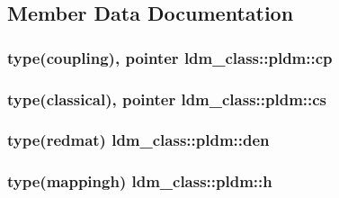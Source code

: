 \subsection{Member Data Documentation}
\hypertarget{structldm__class_1_1pldm_a5bb9f63f699c8b080da3d40a437258a3}{
\subsubsection[{cp}]{\setlength{\rightskip}{0pt plus 5cm}type(coupling), pointer ldm\+\_\+class\+::pldm\+::cp\hspace{0.3cm}{\ttfamily [private]}}}\label{structldm__class_1_1pldm_a5bb9f63f699c8b080da3d40a437258a3}
\hypertarget{structldm__class_1_1pldm_a83adb89b8aff81ac0a5c072c3fd79280}{
\subsubsection[{cs}]{\setlength{\rightskip}{0pt plus 5cm}type(classical), pointer ldm\+\_\+class\+::pldm\+::cs\hspace{0.3cm}{\ttfamily [private]}}}\label{structldm__class_1_1pldm_a83adb89b8aff81ac0a5c072c3fd79280}
\hypertarget{structldm__class_1_1pldm_ac785228707f5246b180a08c9b94bf437}{
\subsubsection[{den}]{\setlength{\rightskip}{0pt plus 5cm}type({\bf redmat}) ldm\+\_\+class\+::pldm\+::den\hspace{0.3cm}{\ttfamily [private]}}}\label{structldm__class_1_1pldm_ac785228707f5246b180a08c9b94bf437}
\hypertarget{structldm__class_1_1pldm_af5cfb52905ca6c3b4069bfbe3eb2afdb}{
\subsubsection[{h}]{\setlength{\rightskip}{0pt plus 5cm}type({\bf mappingh}) ldm\+\_\+class\+::pldm\+::h\hspace{0.3cm}{\ttfamily [private]}}}\label{structldm__class_1_1pldm_af5cfb52905ca6c3b4069bfbe3eb2afdb}
